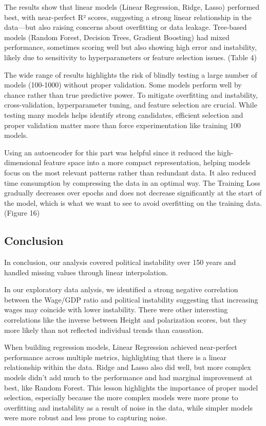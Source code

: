\documentclass[
  letterpaper,
  DIV=11,
  numbers=noendperiod]{scrartcl}
\begin{document}
The results show that linear models (Linear Regression, Ridge, Lasso)
performed best, with near-perfect R² scores, suggesting a strong linear
relationship in the data---but also raising concerns about overfitting
or data leakage. Tree-based models (Random Forest, Decision Trees,
Gradient Boosting) had mixed performance, sometimes scoring well but
also showing high error and instability, likely due to sensitivity to
hyperparameters or feature selection issues. (Table 4)

The wide range of results highlights the risk of blindly testing a large
number of models (100-1000) without proper validation. Some models
perform well by chance rather than true predictive power. To mitigate
overfitting and instability, cross-validation, hyperparameter tuning,
and feature selection are crucial. While testing many models helps
identify strong candidates, efficient selection and proper validation
matter more than force experimentation like training 100 models.

Using an autoencoder for this part was helpful since it reduced the
high-dimensional feature space into a more compact representation,
helping models focus on the most relevant patterns rather than redundant
data. It also reduced time consumption by compressing the data in an
optimal way. The Training Loss gradually decreases over epochs and does
not decrease significantly at the start of the model, which is what we
want to see to avoid overfitting on the training data. (Figure 16)

\subsection{Conclusion}\label{conclusion}

In conclusion, our analysis covered political instability over 150 years
and handled missing values through linear interpolation.

In our exploratory data anlysis, we identified a strong negative
correlation between the Wage/GDP ratio and political instability
suggesting that increasing wages may coincide with lower instability.
There were other interesting correlations like the inverse between
Height and polarization scores, but they more likely than not reflected
individual trends than causation.

When building regression models, Linear Regression achieved near-perfect
performance across multiple metrics, highlighting that there is a linear
relationship within the data. Ridge and Lasso also did well, but more
complex models didn't add much to the performance and had marginal
improvement at best, like Random Forest. This lesson highlights the
importance of proper model selection, especially because the more
complex models were more prone to overfitting and instability as a
result of noise in the data, while simpler models were more robust and
less prone to capturing noise.
\end{document}
